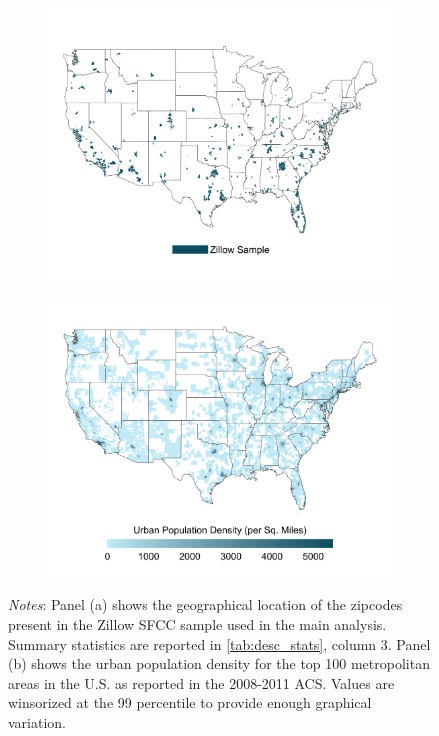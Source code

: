 \begin{figure}
	\caption{Comparison Between Zillow Sample and Population Density}
	\label{fig:maps}
	\begin{subfigure}[b]{\textwidth}\centering
		\includegraphics[width = .85\textwidth]{../../analysis/descriptive_maps/output/sample_map.png}
	\end{subfigure}
	\quad 
	\begin{subfigure}[b]{\textwidth}\centering
		\includegraphics[width = .85\textwidth]{../../analysis/descriptive_maps/output/popurban_density_map.png}
	\end{subfigure}
		\begin{minipage}{.95\textwidth} \footnotesize
		\vspace{2mm} 
		\textit{Notes}: Panel (a) shows the geographical location of the zipcodes present in the Zillow 
		SFCC sample 	used in the main analysis. Summary statistics are reported in 
		\autoref{tab:desc_stats}, column 3. Panel (b) shows the urban population density for the top 100 
		metropolitan areas in the U.S. as reported in the 2008-2011 ACS. Values are winsorized at the 99 
		percentile to provide enough graphical variation. 
	\end{minipage}
\end{figure}

